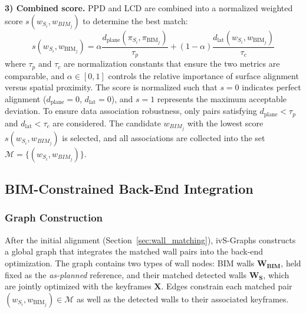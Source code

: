 \textbf{3) Combined score.}  
PPD and LCD are combined into a normalized weighted score $s(w_{S_i},w_{BIM_j})$ to determine the best match:
\begin{equation}
s(w_{S_i}, w_{\text{BIM}_j}) = \alpha 
\frac{d_\text{plane}(\pi_{S_i}, \pi_{\text{BIM}_j})}{\tau_p} + 
(1-\alpha) \frac{d_{\text{lat}}(w_{S_i}, w_{\text{BIM}_j})}{\tau_c}
\end{equation}
where $\tau_p$ and $\tau_c$ are normalization constants that ensure the two metrics are comparable, and $\alpha \in [0,1]$ controls the relative importance of surface alignment versus spatial proximity. The score is normalized such that $s = 0$ indicates perfect alignment ($d_\text{plane} = 0$, $d_\text{lat} = 0$), and $s = 1$ represents the maximum acceptable deviation.
To ensure data association robustness, only pairs satisfying $d_\text{plane} < \tau_p$ and $d_\text{lat} < \tau_c$ are considered. The candidate $w_{BIM_j}$ with the lowest score $s(w_{S_i},w_{BIM_j})$ is selected, and all associations are collected into the set $\mathcal{M} = \{ (w_{S_i}, w_{BIM_j}) \}$.


\subsection{BIM-Constrained Back-End Integration}
\label{sec:bim_backend}

\subsubsection*{\textbf{Graph Construction}}
{After the initial alignment (Section~\ref{sec:wall_matching}), ivS-Graphs constructs a global graph that integrates the matched wall pairs into the back-end optimization. 
The graph contains two types of wall nodes: BIM walls $\mathbf{W_{\text{BIM}}}$, held fixed as the \textit{as-planned} reference, and their matched detected walls $\mathbf{W_S}$, which are jointly optimized with the keyframes $\mathbf{X}$. Edges constrain each matched pair $(w_{S_i}, w_{\text{BIM}_j}) \in \mathcal{M}$ as well as the detected walls to their associated keyframes.}


